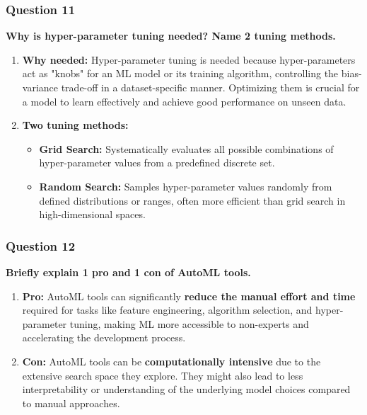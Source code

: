 \documentclass{article}
\begin{document}
\subsubsection*{Question 11}
\textbf{Why is hyper-parameter tuning needed? Name 2 tuning methods.}
    \begin{enumerate}[label=\alph*)]
        \item \textbf{Why needed:} Hyper-parameter tuning is needed because hyper-parameters act as "knobs" for an ML model or its training algorithm, controlling the bias-variance trade-off in a dataset-specific manner. Optimizing them is crucial for a model to learn effectively and achieve good performance on unseen data.
        \item \textbf{Two tuning methods:}
        \begin{itemize}
            \item \textbf{Grid Search:} Systematically evaluates all possible combinations of hyper-parameter values from a predefined discrete set.
            \item \textbf{Random Search:} Samples hyper-parameter values randomly from defined distributions or ranges, often more efficient than grid search in high-dimensional spaces.
        \end{itemize}
    \end{enumerate}

\subsubsection*{Question 12}
\textbf{Briefly explain 1 pro and 1 con of AutoML tools.}
    \begin{enumerate}[label=\alph*)]
        \item \textbf{Pro:} AutoML tools can significantly \textbf{reduce the manual effort and time} required for tasks like feature engineering, algorithm selection, and hyper-parameter tuning, making ML more accessible to non-experts and accelerating the development process.
        \item \textbf{Con:} AutoML tools can be \textbf{computationally intensive} due to the extensive search space they explore. They might also lead to less interpretability or understanding of the underlying model choices compared to manual approaches.
    \end{enumerate}
\end{document}
